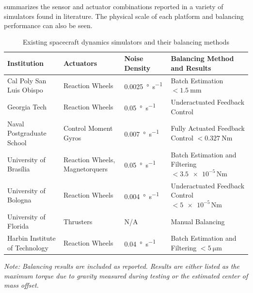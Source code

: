 summarizes the sensor and actuator combinations reported in a variety of simulators found in literature. The physical scale of each platform and balancing performance can also be seen. 

\begin{table}[!ht]
\caption{Existing spacecraft dynamics simulators and their balancing methods}\label{table:existing_testbeds}
\centering
\renewcommand{\arraystretch}{1.3}

\begin{tabularx}{\textwidth}{
    >{\raggedright\arraybackslash}p{3cm}   %
    >{\raggedright\arraybackslash}p{3.5cm} %
    >{\raggedright\arraybackslash}p{2.2cm} %
    >{\raggedright\arraybackslash}X}       %
\toprule
\textbf{Institution} & \textbf{Actuators} & \textbf{Noise Density} & \textbf{Balancing Method and Results} \\
\midrule
Cal Poly San Luis Obispo~\cite{dam_applied_2014} & 
Reaction Wheels & 
\SI{0.0025}{\degree\per\second} & 
Batch Estimation \newline $<\SI{1.5}{\milli\metre}$ \\
\addlinespace[0.75em]

Georgia Tech~\cite{choi_automatic_2016} & 
Reaction Wheels & 
\SI{0.05}{\degree\per\second} & 
Underactuated Feedback Control \\
\addlinespace[0.75em]
Naval Postgraduate School~\cite{kim_system_2006} & 
Control Moment Gyros & 
\SI{0.007}{\degree\per\second} & 
Fully Actuated Feedback Control \newline $<\SI{0.327}{\newton\metre}$ \\
\addlinespace[0.75em]
University of Brasília~\cite{silva_filtering_2018} & 
Reaction Wheels, Magnetorquers & 
\SI{0.05}{\degree\per\second} & 
Batch Estimation and Filtering \newline $<\num{3.5e-5}\,\si{\newton\metre}$ \\
\addlinespace[0.75em]
University of Bologna~\cite{modenini2020dynamic} & 
Reaction Wheels & 
\SI{0.004}{\degree\per\second} & 
Underactuated Feedback Control \newline $<\num{5e-5}\,\si{\newton\metre}$ \\
\addlinespace[0.75em]
University of Florida~\cite{saulnier2014six} & 
Thrusters & 
N/A & 
Manual Balancing \\
\addlinespace[0.75em]
Harbin Institute of Technology~\cite{xu_parameter_2015} & 
Reaction Wheels & 
\SI{0.04}{\degree\per\second} & 
Batch Estimation and Filtering \newline $<\SI{5}{\micro\metre}$ \\
\bottomrule
\end{tabularx}

\vspace{0.5em}
\raggedright\footnotesize
\textit{Note: Balancing results are included as reported. Results are either listed as the maximum torque due to gravity measured during testing or the estimated center of mass offset.}
\end{table}

